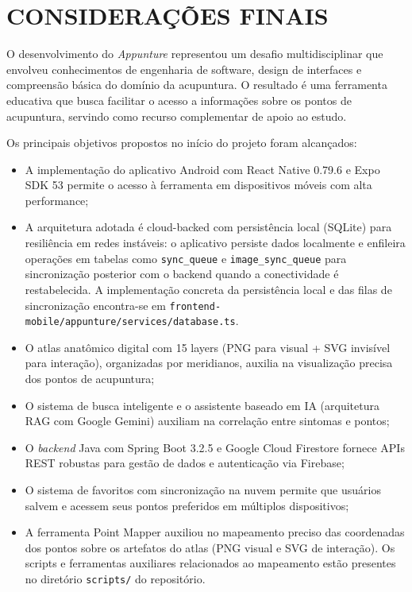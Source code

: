 \chapter{CONSIDERAÇÕES FINAIS} \label{cha:consideracoes}

O desenvolvimento do \textit{Appunture} representou um desafio multidisciplinar que envolveu conhecimentos de engenharia de software, design de interfaces e compreensão básica do domínio da acupuntura. O resultado é uma ferramenta educativa que busca facilitar o acesso a informações sobre os pontos de acupuntura, servindo como recurso complementar de apoio ao estudo.

Os principais objetivos propostos no início do projeto foram alcançados:

\begin{itemize}
    \item A implementação do aplicativo Android com React Native 0.79.6 e Expo SDK 53 permite o acesso à ferramenta em dispositivos móveis com alta performance;
    \item A arquitetura adotada é cloud-backed com persistência local (SQLite) para resiliência em redes instáveis: o aplicativo persiste dados localmente e enfileira operações em tabelas como \texttt{sync\_queue} e \texttt{image\_sync\_queue} para sincronização posterior com o backend quando a conectividade é restabelecida. A implementação concreta da persistência local e das filas de sincronização encontra-se em \texttt{frontend-mobile/appunture/services/database.ts}.
    \item O atlas anatômico digital com 15 layers (PNG para visual + SVG invisível para interação), organizadas por meridianos, auxilia na visualização precisa dos pontos de acupuntura;
    \item O sistema de busca inteligente e o assistente baseado em IA (arquitetura RAG com Google Gemini) auxiliam na correlação entre sintomas e pontos;
    \item O \textit{backend} Java com Spring Boot 3.2.5 e Google Cloud Firestore fornece APIs REST robustas para gestão de dados e autenticação via Firebase;
    \item O sistema de favoritos com sincronização na nuvem permite que usuários salvem e acessem seus pontos preferidos em múltiplos dispositivos;
    \item A ferramenta Point Mapper auxiliou no mapeamento preciso das coordenadas dos pontos sobre os artefatos do atlas (PNG visual e SVG de interação). Os scripts e ferramentas auxiliares relacionados ao mapeamento estão presentes no diretório \texttt{scripts/} do repositório.
\end{itemize}

